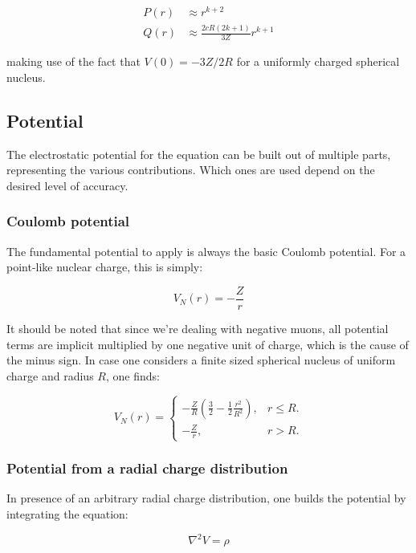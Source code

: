 \documentclass[]{report}
\begin{document}
\begin{align}
P(r) &\approx r^{k+2} \\
Q(r) &\approx \frac{2cR(2k+1)}{3Z}r^{k+1}
\end{align}

making use of the fact that $V(0) = -3Z/2R$ for a uniformly charged spherical nucleus.

\subsection{Potential}\label{num_pot}

The electrostatic potential for the equation can be built out of multiple parts, representing the various contributions. Which ones are used depend on the desired level of accuracy.

\subsubsection{Coulomb potential}

The fundamental potential to apply is always the basic Coulomb potential. For a point-like nuclear charge, this is simply:

\begin{equation}
	V_N(r) = -\frac{Z}{r}
\end{equation}

It should be noted that since we're dealing with negative muons, all potential terms are implicit multiplied by one negative unit of charge, which is the cause of the minus sign. In case one considers a finite sized spherical nucleus of uniform charge and radius $R$, one finds:

\begin{equation}
V_N(r) = \begin{cases}
-\frac{Z}{R}\left(\frac{3}{2}-\frac{1}{2}\frac{r^2}{R^2}\right), & \text{$r\leq R$}.\\
-\frac{Z}{r}, & \text{$r > R$}.
\end{cases}
\end{equation}

\subsubsection{Potential from a radial charge distribution}\label{subsec_bkg_pot}
In presence of an arbitrary radial charge distribution, one builds the potential by integrating the equation:

\begin{equation}
\nabla^2 V = \rho
\end{equation}
\end{document}
